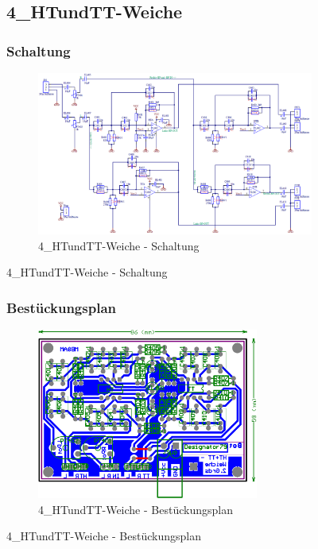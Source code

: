 \begin{figure}
	\subsection{4\_HTundTT-Weiche}
	\subsubsection*{Schaltung}
	\begin{figure} [H]
		\centering
		\includegraphics[width=1\textwidth]{img/Print4/4_TTuHTWeiche-Schematic.png}
		\caption{4\_HTundTT-Weiche - Schaltung}
		\label {fig:8.10.13}
	\end{figure}
\end{figure}

\begin{figure}
	\subsubsection*{Bestückungsplan}
	\begin{figure} [H]
		\centering
		\includegraphics[width=0.8\textwidth]{img/Print4/4_TTuHTWeiche-Best.png}
		\caption{4\_HTundTT-Weiche - Bestückungsplan}
		\label {fig:8.10.14}
	\end{figure}
\end{figure}

